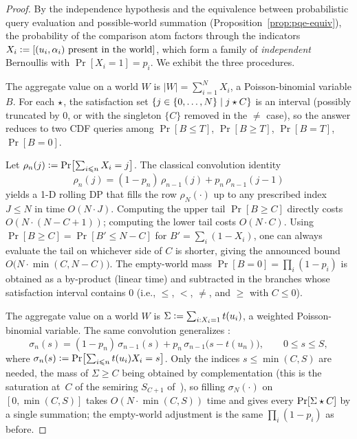 \begin{proof}
By the independence hypothesis and the equivalence between
probabilistic query evaluation and possible-world summation
(Proposition~\ref{prop:pqe-equiv}), the probability of the comparison
atom factors through the indicators
$X_i\mathrel{\mathop:}=[(u_i,\alpha_i)\text{ present in the world}]$, which form a
family of \emph{independent} Bernoullis with $\Pr[X_i=1]=p_i$.
We exhibit the three procedures.

The aggregate value on a world $W$ is $|W|=\sum_{i=1}^N X_i$, a
Poisson-binomial variable $B$.  For each $\mathbin{\mathsf{\star}}$, the satisfaction set
$\{j\in\{0,\dots,N\}\mid j\mathbin{\mathsf{\star}} C\}$ is an interval (possibly truncated
by $0$, or with the singleton $\{C\}$ removed in the $\neq$ case), so
the answer reduces to two CDF queries among $\Pr[B\le T]$,
$\Pr[B\ge T]$, $\Pr[B=T]$, $\Pr[B=0]$.

Let $\rho_n(j)\mathrel{\mathop:}=\Pr\bigl[\sum_{i\leqslant n}X_i=j\bigr]$.
The classical convolution identity
\[
\rho_n(j)=(1-p_n)\,\rho_{n-1}(j)+p_n\,\rho_{n-1}(j-1)
\]
yields a 1-D rolling DP that fills the row $\rho_N(\cdot)$ up to any
prescribed index $J\le N$ in time $O(N\cdot J)$.
Computing the upper tail $\Pr[B\ge C]$ directly costs
$O(N\cdot(N-C+1))$; computing the lower tail costs $O(N\cdot C)$.
Using $\Pr[B\ge C]=\Pr[B'\le N-C]$ for $B'=\sum_i(1-X_i)$, one can
always evaluate the tail on whichever side of $C$ is shorter, giving
the announced bound $O\bigl(N\cdot\min(C,N-C)\bigr)$.
The empty-world mass $\Pr[B=0]=\prod_i(1-p_i)$ is obtained as a
by-product (linear time) and subtracted in the branches whose
satisfaction interval contains $0$ (i.e., $\le$, $<$, $\neq$, and $\ge$
with $C\le0$).

The aggregate value on a world $W$ is
$\Sigma\mathrel{\mathop:}=\sum_{i:X_i=1}t(u_i)$, a weighted Poisson-binomial
variable.  The same convolution generalizes
:
\[
\sigma_n(s)=(1-p_n)\,\sigma_{n-1}(s)+p_n\,\sigma_{n-1}\bigl(s-t(u_n)\bigr),
\qquad
0\le s\le S,
\]
where $\sigma_n(s)\mathrel{\mathop:}=\Pr\bigl[\sum_{i\leqslant n}t(u_i)X_i=s\bigr]$.
Only the indices $s\le\min(C,S)$ are needed, the mass of $\Sigma\ge C$
being obtained by complementation (this is the saturation at~$C$ of the
semiring $S_{C+1}$ of~\cite{re2009trichotomy}), so filling
$\sigma_N(\cdot)$ on $[0,\min(C,S)]$ takes $O(N\cdot\min(C,S))$ time and
gives every $\Pr[\Sigma\mathbin{\mathsf{\star}} C]$ by a single summation; the empty-world
adjustment is the same $\prod_i(1-p_i)$ as before.


\end{proof}
